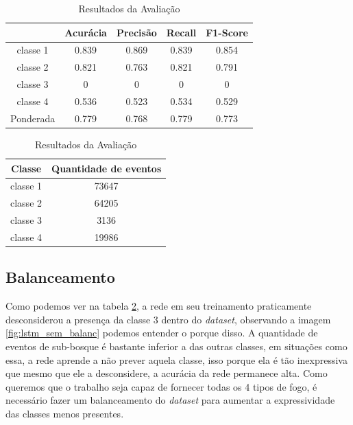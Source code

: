    
\begin{table}[h]
    \centering
    \begin{tabular}{|c|c|c|c|c|}
        \hline
        & Acurácia & Precisão & Recall & F1-Score \\
        \hline
        classe 1 & 0.839 & 0.869 & 0.839 & 0.854 \\
        classe 2 & 0.821 & 0.763 & 0.821 & 0.791 \\
        classe 3 & 0 & 0 & 0 & 0 \\
        classe 4 & 0.536 & 0.523 & 0.534 & 0.529 \\
        \hline
        Ponderada & 0.779 & 0.768 & 0.779 & 0.773 \\
        \hline
    \end{tabular}


    \vspace{10pt}
    
    \begin{tabular}{|c|c|}
        \hline
        Classe & Quantidade de eventos \\
        \hline
        classe 1 & 73647 \\
        classe 2 & 64205 \\
        classe 3 & 3136 \\
        classe 4 & 19986 \\
        \hline
    \end{tabular}
    \caption{Resultados da Avaliação}
    \label{tab:resultados}
\end{table}

\subsection{Balanceamento}

Como podemos ver na tabela \ref{tab:resultados}, a rede em seu treinamento praticamente desconsiderou a presença da classe 3 dentro do \textit{dataset}, observando a imagem \ref{fig:lstm_sem_balanc} podemos entender o porque disso. A quantidade de eventos de sub-bosque é bastante inferior a das outras classes, em situações como essa, a rede aprende a não prever aquela classe, isso porque ela é tão inexpressiva que mesmo que ele a desconsidere, a acurácia da rede permanece alta. Como queremos que o trabalho seja capaz de fornecer todas os 4 tipos de fogo, é necessário fazer um balanceamento do \textit{dataset} para aumentar a expressividade das classes menos presentes.

